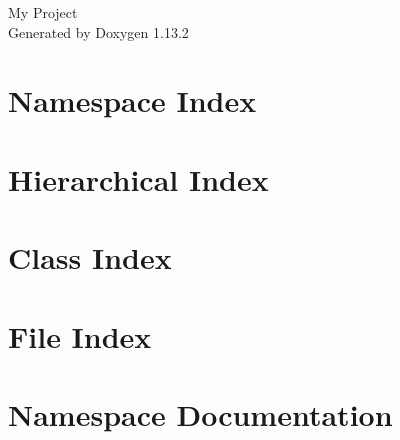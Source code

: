 \documentclass[twoside]{book}
\newcommand{\+}{\discretionary{\mbox{\scriptsize$\hookleftarrow$}}{}{}}
\newcommand{\clearemptydoublepage}{%
    \newpage{\pagestyle{empty}\cleardoublepage}%
  }
\begin{document}
  \raggedbottom
    \hypersetup{pageanchor=false,
                bookmarksnumbered=true,
                pdfencoding=unicode
               }
  \begin{titlepage}
  \vspace*{7cm}
  \begin{center}%
  {\Large My Project}\\
  \vspace*{1cm}
  {\large Generated by Doxygen 1.13.2}\\
  \end{center}
  \end{titlepage}
  \clearemptydoublepage
  \tableofcontents
  \clearemptydoublepage
  \hypersetup{pageanchor=true}



\chapter{Namespace Index}

\chapter{Hierarchical Index}

\chapter{Class Index}

\chapter{File Index}

\chapter{Namespace Documentation}

















\end{document}
